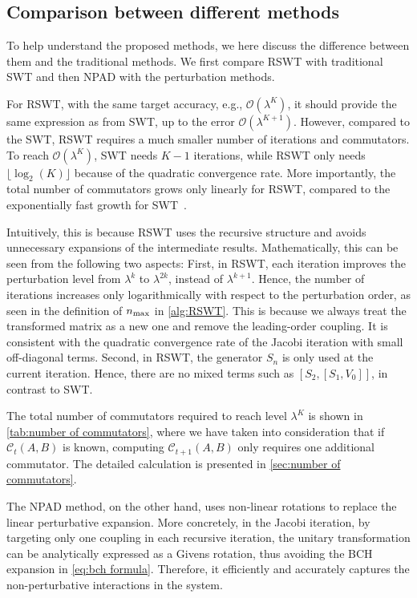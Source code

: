 \documentclass[%
 reprint,
 amsmath,amssymb,
 aps,
pra,
noeprint,
superscriptaddress,
]{revtex4-2}
\begin{document}
\subsection{Comparison between different methods}
To help understand the proposed methods, we here discuss the difference between them and the traditional methods.
We first compare RSWT with traditional SWT and then NPAD with the perturbation methods.

For RSWT, with the same target accuracy, e.g., $\mathcal{O}(\lambda^{K})$, it should provide the same expression as from SWT, up to the error $\mathcal{O}(\lambda^{K+1})$.
However, compared to the SWT, RSWT requires a much smaller number of iterations and commutators.
To reach $\mathcal{O}(\lambda^K)$, SWT needs $K-1$ iterations, while RSWT only needs $\lfloor\log_2(K) \rfloor$ because of the quadratic convergence rate.
More importantly, the total number of commutators grows only linearly for RSWT, compared to the exponentially fast growth for SWT~\cite{Magesan2020}.

Intuitively, this is because RSWT uses the recursive structure and avoids unnecessary expansions of the intermediate results.
Mathematically, this can be seen from the following two aspects:
First, in RSWT, each iteration improves the perturbation level from $\lambda^k$ to $\lambda^{2k}$, instead of $\lambda^{k+1}$.
Hence, the number of iterations increases only logarithmically with respect to the perturbation order, as seen in the definition of $n_{\rm{max}}$ in \cref{alg:RSWT}.
This is because we always treat the transformed matrix as a new one and remove the leading-order coupling.
It is consistent with the quadratic convergence rate of the Jacobi iteration with small off-diagonal terms.
Second, in RSWT, the generator $S_n$ is only used at the current iteration.
Hence, there are no mixed terms such as $[S_2, [S_1, V_0]]$, in contrast to SWT.

The total number of commutators required to reach level $\lambda^K$ is shown in \cref{tab:number of commutators},
where we have taken into consideration that if $\mathcal{C}_t(A,B)$ is known, computing $\mathcal{C}_{t+1}(A,B)$ only requires one additional commutator.
The detailed calculation is presented in \cref{sec:number of commutators}.


The NPAD method, on the other hand, uses non-linear rotations to replace the linear perturbative expansion.
More concretely, in the Jacobi iteration, by targeting only one coupling in each recursive iteration, the unitary transformation can be analytically expressed as a Givens rotation, thus avoiding the BCH expansion in \cref{eq:bch formula}.
Therefore, it efficiently and accurately captures the non-perturbative interactions in the system.
\end{document}
